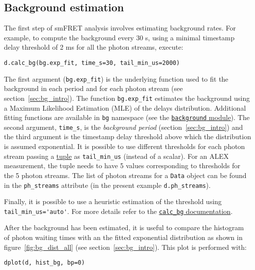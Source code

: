 \subsection{Background estimation}
\label{sec:bg_calc}

The first step of smFRET analysis involves estimating background rates.
For example, to compute the background every 30 s, using a minimal timestamp
delay threshold of 2 ms for all the photon streams, execute:

\begin{lstlisting}
d.calc_bg(bg.exp_fit, time_s=30, tail_min_us=2000)
\end{lstlisting}

The first argument (\verb|bg.exp_fit|) is the underlying function used to fit the
background in each period and for each photon stream (see section~\ref{sec:bg_intro}).
The function
\verb|bg.exp_fit| estimates the background using a Maximum Likelihood Estimation
(MLE) of the delays distribution. Additional fitting functions are available in
\verb|bg| namespace (see the
\href{http://fretbursts.readthedocs.org/en/latest/background.html}
{\texttt{background} module}). The second argument, \verb|time_s|, is the
\textit{background period} (section~\ref{sec:bg_intro}) and the third argument
is the timestamp delay threshold above which the distribution is assumed exponential.
It is possible to use different thresholds
for each photon stream passing a
\href{https://docs.python.org/2/tutorial/datastructures.html#tuples-and-sequences}{tuple}
as \verb|tail_min_us| (instead of a scalar).
For an ALEX measurement, the tuple needs to have 5 values
corresponding to thresholds for the 5 photon streams. The list of photon
streams for a \verb|Data| object can be found in the \verb|ph_streams|
attribute (in the present example \verb|d.ph_streams|).

Finally, it is possible to use a heuristic estimation of the threshold using
\verb|tail_min_us='auto'|. For more details refer to the
\href{http://fretbursts.readthedocs.org/en/latest/data\_class.html#fretbursts.burstlib.Data.calc\_bg}{\texttt{calc\_bg} documentation}.

After the background has been estimated, it is useful to compare the histogram of 
photon waiting times with an the fitted exponential distribution as shown in figure~\ref{fig:bg_dist_all}
(see section~\ref{sec:bg_intro}). This plot is performed with:

\begin{lstlisting}
dplot(d, hist_bg, bp=0)
\end{lstlisting}

